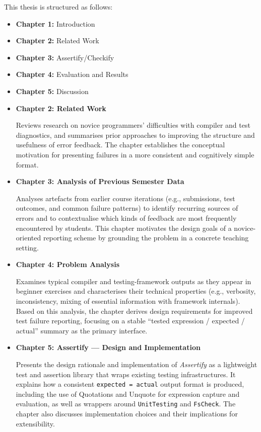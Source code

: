 This thesis is structured as follows:
\begin{itemize}
    \item \textbf{Chapter 1:} Introduction
    \item \textbf{Chapter 2:} Related Work
    \item \textbf{Chapter 3:} Assertify/Checkify
    \item \textbf{Chapter 4:} Evaluation and Results
    \item \textbf{Chapter 5:} Discussion

    \item \textbf{Chapter 2: Related Work}
        \begin{justify}Reviews research on novice programmers' difficulties with compiler and test diagnostics, and summarises prior approaches to improving the structure and usefulness of error feedback.
            The chapter establishes the conceptual motivation for presenting failures in a more consistent and cognitively simple format.\end{justify}

    \item \textbf{Chapter 3: Analysis of Previous Semester Data}
        \begin{justify}Analyses artefacts from earlier course iterations (e.g., submissions, test outcomes, and common failure patterns) to identify recurring sources of errors and
            to contextualise which kinds of feedback are most frequently encountered by students.
            This chapter motivates the design goals of a novice-oriented reporting scheme by grounding the problem in a concrete teaching setting.\end{justify}

    \item \textbf{Chapter 4: Problem Analysis}
        \begin{justify}Examines typical compiler and testing-framework outputs as they appear in beginner exercises and characterises their technical properties
            (e.g., verbosity, inconsistency, mixing of essential information with framework internals). Based on this analysis,
            the chapter derives design requirements for improved test failure reporting, focusing on a stable ``tested expression / expected / actual'' summary as the primary interface.\end{justify}

    \item \textbf{Chapter 5: Assertify --- Design and Implementation}
        \begin{justify}Presents the design rationale and implementation of \emph{Assertify} as a lightweight test and assertion library that wraps existing testing infrastructures.
            It explains how a consistent \texttt{expected = actual} output format is produced, including the use of Quotations and Unquote for expression capture and evaluation,
            as well as wrappers around \texttt{UnitTesting} and \texttt{FsCheck}. The chapter also discusses implementation choices and their implications for extensibility.\end{justify}


\end{itemize}

